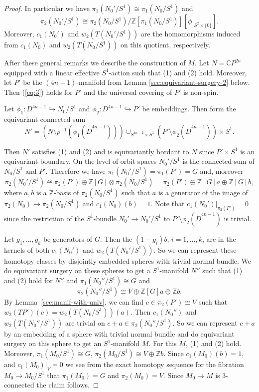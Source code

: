 \documentclass[a4paper, 11pt]{amsart}
\theoremstyle{definition}
\theoremstyle{remark}
\numberwithin{equation}{section}
\begin{document}
\begin{proof}
  In particular we have \(\pi_1(N_0'/S^1)\cong \pi_1(N_0/S^1)\) and
  \[\pi_2(N_0'/S^1)\cong \pi_2(N_0/S^1)/\mathbb{Z}[\pi_1(N_0/S^1)][\phi|_{S^2\times \{0\}}].\]
  Moreover, \(c_1(N_0')\) and \(w_2(T(N_0'/S^1))\)  are the homomorphisms induced from \(c_1(N_0)\) and \(w_2(T(N_0/S^1))\)  on this quotient, respectively. 
  

  After these general remarks we describe the construction of \(M\).
  Let \(N=\mathbb{C}P^{2n}\) equipped with a linear effective \(S^1\)-action such that (1) and (2) hold.
  Moreover, let \(P'\) be the \((4n-1)\)-manifold from Lemma \ref{sec:equivariant-surgery-2} below.
  Then (\ref{eq:3}) holds for \(P'\) and the universal covering of \(P'\) is non-spin.

  Let \(\phi_1: D^{4n-1}\hookrightarrow N_0/S^1\) and \(\phi_2:D^{4n-1}\hookrightarrow P'\) be embeddings. Then form the equivariant connected sum
  \[N'=(N\setminus p^{-1}(\phi_1(\dot{D}^{4n-1})))\cup_{S^{4n-2}\times S^1} (P'\setminus \phi_2(\dot{D}^{4n-1}))\times S^1.\]

  Then \(N'\) satisfies (1) and (2) and is equivariantly bordant to \(N\) since \(P'\times S^1\) is an equivariant boundary.
  On the level of orbit spaces \(N_0'/S^1\) is the connected sum of \(N_0/S^1\) and \(P'\).
  Therefore we have \(\pi_1(N_0'/S^1)=\pi_1(P')=G\) and, moreover
  \[\pi_2(N_0'/S^1)\cong \pi_2(P')\oplus \mathbb{Z}[G] \otimes \pi_2(N_0/S^1) =\pi_2(P')\oplus \mathbb{Z}[G] a \oplus \mathbb{Z}[G] b,\]
  where \(a,b\) is a \(\mathbb{Z}\)-basis of \(\pi_2(N_0/S^1)\) such that \(a\) is a generator of the image of \(\pi_2(N_0)\rightarrow \pi_2(N_0/S^1)\) and \(c_1(N_0)(b)=1\).
  Note that \(c_1(N_0')|_{\pi_2(P')}=0\) since the restriction of the \(S^1\)-bundle \(N_0'\rightarrow N_0'/S^1\) to \(P'\setminus  \phi_2(\dot{D}^{4n-1})\) is trivial.

  Let \(g_1,\dots,g_k\) be generators of \(G\). Then the \((1-g_i)b\), \(i=1,\dots,k\), are in the kernels of both \(c_1(N_0')\) and \(w_2(T(N_0'/S^1))\).
  So we can represent these homotopy classes by disjointly embedded spheres with trivial normal bundle.
  We do equivariant surgery on these spheres to get a \(S^1\)-manifold \(N''\) such that (1) and (2) hold for \(N''\) and \(\pi_1(N_0''/S^1)\cong G\) and
  \[\pi_2(N_0''/S^1)\cong V\oplus \mathbb{Z}[G]a\oplus \mathbb{Z} b.\]
  By Lemma~\ref{sec:manif-with-univ}, we can find \(c\in \pi_2(P')\cong V\) such that \(w_2(TP')(c)=w_2(T(N_0/S^1))(a)\).
  Then \(c_1(N_0'')\) and \(w_2(T(N_0''/S^1))\) are trivial on \(c+a\in \pi_2(N_0''/S^1)\).
  So we can represent \(c+a\) by an embedding of a sphere with trivial normal bundle and do equivariant surgery on this sphere to get an \(S^1\)-manifold \(M\).
  For this \(M\), (1) and (2) hold.
  Moreover, \(\pi_1(M_0/S^1)\cong G\), \(\pi_2(M_0/S^1)\cong V\oplus \mathbb{Z}b\).
  Since \(c_1(M_0)(b)=1\), and \(c_1(M_0)|_V=0\) we see from the exact homotopy sequence for the fibration \(M_0\rightarrow M_0/S^1\) that
  \(\pi_1(M_0)=G\) and \(\pi_2(M_0)=V\).
  Since \(M_0\rightarrow M\) is 3-connected the claim follows.
\end{proof}
\end{document}
